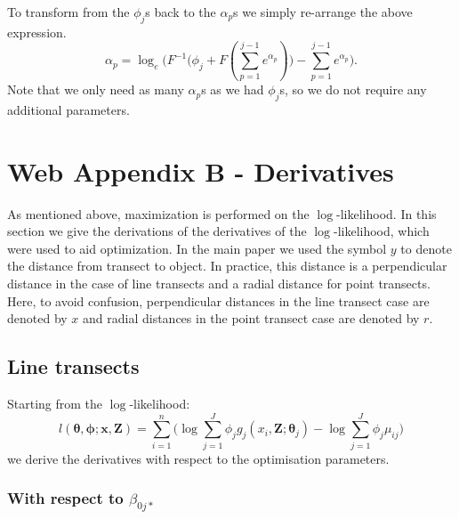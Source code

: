 \documentclass{report}
\begin{document}
To transform from the $\phi_j$s back to the $\alpha_p$s we simply re-arrange the above expression.
\begin{equation*}
\alpha_p = \log_e \Big(F^{-1}\Big(\phi_j + F(\sum_{p=1}^{j-1} e^{\alpha_p})\Big) - \sum_{p=1}^{j-1} e^{\alpha_p}\Big).
\end{equation*}
Note that we only need as many $\alpha_p$s as we had $\phi_j$s, so we do not require any additional parameters.

\section*{Web Appendix B - Derivatives}

As mentioned above, maximization is performed on the $\log$-likelihood. In this section we give the derivations of the derivatives of the $\log$-likelihood, which were used to aid optimization. In the main paper we used the symbol $y$ to denote the distance from transect to object.  In practice, this distance is a perpendicular distance in the case of line transects and a radial distance for point transects.  Here, to avoid confusion, perpendicular distances in the line transect case are denoted by $x$ and radial distances in the point transect case are denoted by $r$.

\subsection*{Line transects}

Starting from the $\log$-likelihood:
\begin{equation}
l(\bm{\theta}, \bm{\phi}; \mathbf{x},\mathbf{Z}) = \sum_{i=1}^n \Big( \log \sum_{j=1}^J \phi_j g_j(x_i,\mathbf{Z}; \bm{\theta}_j) - \log \sum_{j=1}^J \phi_j \mu_{ij}\Big)
\label{lt-lik}
\end{equation}
we derive the derivatives with respect to the optimisation parameters.

\subsubsection*{With respect to $\beta_{0j*}$}
\end{document}
